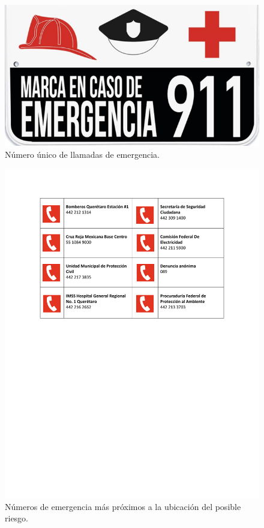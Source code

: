     \begin{figure}[H]
        \centering
        \includegraphics[scale=0.65]{3/Img/emergencias911.png}
        \caption{Número único de llamadas de emergencia.}
    \end{figure}
    \begin{figure}[H]
        \centering
        \includegraphics[trim = {20mm 120mm 20mm 25mm},clip,scale=0.5]{3/Img/directorio.pdf}
        \caption{Números de emergencia más próximos a la ubicación del posible riesgo.}
        \label{fig:directorio}
    \end{figure}
